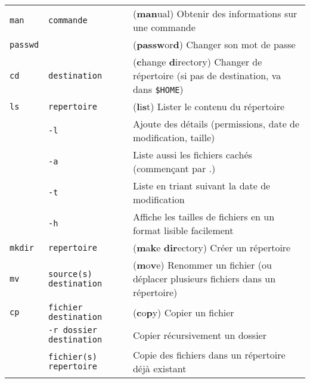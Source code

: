 \documentclass [a4paper]{article}
\begin{document}
\noindent
\begin{tabular}{ lll }
\hline
{\verb+man+}    & \verb+commande+                   & (\textbf{man}ual) Obtenir des informations sur une commande \\
{\verb+passwd+} &                                   & (\textbf{passw}or\textbf{d}) Changer son mot de passe \\
{\verb+cd+}     & \verb+destination+                & (\textbf{c}hange \textbf{d}irectory) Changer de répertoire (si pas de destination, va dans \verb+$HOME+)\\
{\verb+ls+}     & \verb+repertoire+                 & (\textbf{l}i\textbf{s}t) Lister le contenu du répertoire \\
                & \hspace{-0.6cm}\verb+-l+                         & \hspace{0.4cm} Ajoute des détails (permissions, date de modification, taille)\\
                & \hspace{-0.6cm}\verb+-a+                         & \hspace{0.4cm} Liste aussi les fichiers cachés (commençant par .)\\
                & \hspace{-0.6cm}\verb+-t+                         & \hspace{0.4cm} Liste en triant suivant la date de modification\\
                & \hspace{-0.6cm}\verb+-h+                         & \hspace{0.4cm} Affiche les tailles de fichiers en un format lisible facilement\\
{\verb+mkdir+}  & \verb+repertoire+                 & (\textbf{m}a\textbf{k}e \textbf{dir}ectory) Créer un répertoire \\
{\verb+mv+}     & \verb+source(s) destination+      & (\textbf{m}o\textbf{v}e) Renommer un fichier (ou déplacer plusieurs fichiers dans un répertoire) \\
{\verb+cp+}     & \verb+fichier destination+        & (\textbf{c}o\textbf{p}y) Copier un fichier\\
                & \hspace{-0.6cm}\verb+-r dossier destination+     & \hspace{0.4cm} Copier récursivement un dossier\\
                & \verb+fichier(s) repertoire+                     & \hspace{0.4cm} Copie des fichiers dans un répertoire déjà existant\\

\end{tabular}
\end{document}
